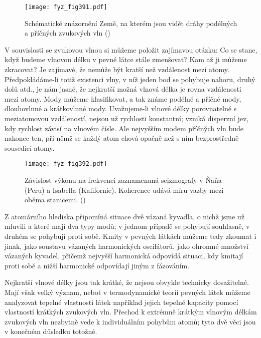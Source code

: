   \begin{figure}[ht!] %
    \centering
    \texttt{[image: fyz\_fig391.pdf]}
    \caption{Schématické znázornění Země, na kterém jsou vidět dráhy podélných a příčných zvukových 
             vln
             (\cite[s.~690]{Feynman01})}
    \label{fyz:fig391}
  \end{figure}
  
  V souvislosti se zvukovou vlnou si můžeme položit zajímavou otázku: Co se stane, když budeme 
  vlnovou délku v pevné látce stále zmenšovat? Kam až ji můžeme zkracovat? Je zajímavé, že nemůže 
  být kratší než vzdálenost mezi atomy. Předpokládáme-li totiž existenci vlny, v níž jeden bod se 
  pohybuje nahoru, druhý dolů atd., je nám jasné, že nejkratší možná vlnová délka je rovna 
  vzdálenosti mezi atomy. Mody můžeme klasifikovat, a tak známe podélné a příčné mody, dlouhovlnné 
  a krátkovlnné mody. Uvažujeme-li vlnové délky porovnatelné s meziatomovou vzdáleností, nejsou už 
  rychlosti konstantní; vzniká disperzní jev, kdy rychlost závisí na vlnovém čísle. Ale nejvyšším 
  modem příčných vln bude nakonec ten, při němž se každý atom chová opačně než s ním bezprostředně 
  sousedící atomy. 

  \begin{figure*} %
    \centering
    \texttt{[image: fyz\_fig392.pdf]}
    \caption{Závislost výkonu na frekvenci zaznamenaná seizmografy v Ñaña (Peru) a Isabella 
             (Kalifornie). Koherence udává míru vazby mezi oběma stanicemi. 
             (\cite[s.~693]{Feynman01})}
    \label{fyz:fig392}
  \end{figure*}
  Z atomárního hlediska připomíná situace dvě vázaná kyvadla, o nichž jsme už mluvili a které mají 
  dva typy modů; v jednom případě se pohybují souhlasně, v druhém se pohybují proti sobě. Kmity v 
  pevných látkách můžeme tedy zkoumat i jinak, jako soustavu vázaných harmonických oscilátorů, jako 
  ohromné množství vázaných kyvadel, přičemž nejvyšší harmonická odpovídá situaci, kdy kmitají 
  proti sobě a nižší harmonické odpovídají jiným z fázováním. 
  
  Nejkratší vlnové délky jsou tak krátké, že nejsou obvykle technicky dosažitelné. Mají však velký 
  význam, neboť v termodynamické teorii pevných látek můžeme analyzovat tepelné vlastnosti látek 
  například jejich tepelné kapacity pomocí vlastností krátkých zvukových vln. Přechod k extrémně 
  krátkým vlnovým délkám zvukových vln nezbytně vede k individuálním pohybům atomů; tyto dvě věci 
  jsou v konečném důsledku totožné. 

